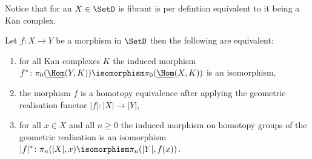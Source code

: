 \begin{rmk}
    Notice that for an $X \in \SetD$ is fibrant is per defintion equivalent to it being a Kan complex.
\end{rmk}

\begin{thm}
    Let $f\colon X  \to Y$ be a morphism in $\SetD$ then the following are equivalent:
    \begin{enumerate}
        \item 
        for all Kan complexes $K$ the induced morphism $f^*\colon \pi_0(\underline{\Hom}(Y,K)) \isomorphism \pi_0(\underline{\Hom}(X,K))$ is an isomorphism,
        \item 
        the morphism $f$ is a homotopy equivalence after applying the geometric realisation functor
        $\lvert f \rvert : \lvert X \rvert \to \lvert Y \rvert$,
        \item 
        for all $x \in X$ and all $n \geq 0$ the induced morphism on homotopy groups of the geometric realisation is an isomorphism $\lvert f \rvert^* \colon  \pi_n(\lvert X \rvert, x) \isomorphism \pi_n(\lvert Y \rvert, f(x))$.
    \end{enumerate}
\end{thm}